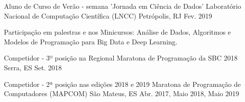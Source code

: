 

\begin{cventries}
\cventry
{Aluno de Curso de Verão - semana 'Jornada em Ciência de Dados'} %
{Laboratório Nacional de Computação Científica (LNCC)} %
{Petrópolis, RJ} %
{Fev. 2019} %
{
	\begin{cvitems} %
		\item {Participação em  palestras e nos Minicursos: Análise de Dados, Algoritmos e Modelos de Programação para Big Data e Deep Learning.}
	\end{cvitems}
}

 \cventry
{Competidor - 3º posição na Regional} %
{Maratona de Programação da SBC 2018} %
{Serra, ES} %
{Set. 2018} %
{
}

\cventry
{Competidor - 2ª posição nas edições 2018 e 2019} %
{Maratona de Programação de Computadores (MAPCOM)} %
{São Mateus, ES} %
{Abr. 2017, Maio 2018, Maio 2019} %
{
}


\end{cventries}
